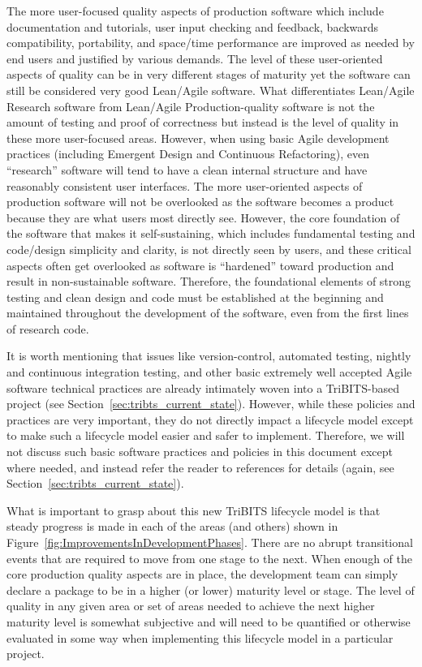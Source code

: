 \documentclass[11pt]{SANDreport}
\begin{document}
The more user-focused quality aspects of production software which include documentation and tutorials, user input checking and feedback, backwards compatibility, portability, and space/time performance are improved as needed by end users and justified by various demands.  The level of these user-oriented aspects of quality can be in very different stages of maturity yet the software can still be considered very good Lean/Agile software.  What differentiates Lean/Agile Research software from Lean/Agile Production-quality software is not the amount of testing and proof of correctness but instead is the level of quality in these more user-focused areas.  However, when using basic Agile development practices (including Emergent Design and Continuous Refactoring), even ``research'' software will tend to have a clean internal structure and have reasonably consistent user interfaces.  The more user-oriented aspects of production software will not be overlooked as the software becomes a product because they are what users most directly see.  However, the core foundation of the software that makes it self-sustaining, which includes fundamental testing and code/design simplicity and clarity, is not directly seen by users, and these critical aspects often get overlooked as software is ``hardened'' toward production and result in non-sustainable software.  Therefore, the foundational elements of strong testing and clean design and code must be established at the beginning and maintained throughout the development of the software, even from the first lines of research code.

It is worth mentioning that issues like version-control, automated testing, nightly and continuous integration testing, and other basic extremely well accepted Agile software technical practices are already intimately woven into a TriBITS-based project (see Section~\ref{sec:tribts_current_state}).  However, while these policies and practices are very important, they do not directly impact a lifecycle model except to make such a lifecycle model easier and safer to implement.  Therefore, we will not discuss such basic software practices and policies in this document except where needed, and instead refer the reader to references for details (again, see Section~\ref{sec:tribts_current_state}).

What is important to grasp about this new TriBITS lifecycle model is that steady progress is made in each of the areas (and others) shown in Figure~\ref{fig:ImprovementsInDevelopmentPhases}.  There are no abrupt transitional events that are required to move from one stage to the next.  When enough of the core production quality aspects are in place, the development team can simply declare a package to be in a higher (or lower) maturity level or stage.  The level of quality in any given area or set of areas needed to achieve the next higher maturity level is somewhat subjective and will need to be quantified or otherwise evaluated in some way when implementing this lifecycle model in a particular project.
\end{document}
